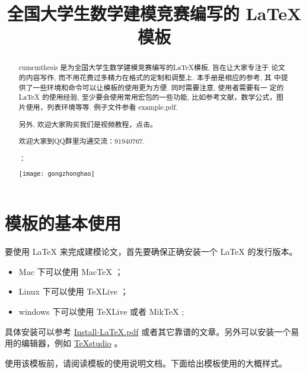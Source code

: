 \documentclass{cumcmthesis}
\title{全国大学生数学建模竞赛编写的 \LaTeX{} 模板}
\begin{document}
 \maketitle
 \begin{abstract}
cumcmthesis 是为全国大学生数学建模竞赛编写的\LaTeX{}模板, 旨在让大家专注于 论文的内容写作, 而不用花费过多精力在格式的定制和调整上. 本手册是相应的参考, 其 中提供了一些环境和命令可以让模板的使用更为方便. 同时需要注意, 使用者需要有一 定的 \LaTeX{} 的使用经验, 至少要会使用常用宏包的一些功能, 比如参考文献，数学公式，图片使用，列表环境等等. 例子文件参看 example.pdf.

另外, 欢迎大家购买我们是视频教程，点击\href{https://item.taobao.com/item.htm?spm=a1z10.1-c.w4004-3473795048.4.ThFQCG&id=43823508044}{}。

欢迎大家到QQ群里沟通交流：91940767.

：

\centerline{\texttt{[image: gongzhonghao]}}

\end{abstract}

\tableofcontents

\newpage

\section{模板的基本使用}

要使用 \LaTeX{} 来完成建模论文，首先要确保正确安装一个 \LaTeX{} 的发行版本。

\begin{itemize}
    \item Mac 下可以使用 Mac\TeX{} ；
    \item Linux 下可以使用 \TeX{}Live ；
    \item windows 下可以使用 \TeX{}Live 或者 Mik\TeX{} ;
\end{itemize}

具体安装可以参考 \href{https://github.com/OsbertWang/install_latex/releases/download/v4.6/Install-LaTeX.pdf}{Install-LaTeX.pdf} 或者其它靠谱的文章。另外可以安装一个易用的编辑器，例如 \href{https://github.com/texstudio-org/texstudio/releases/download/2.12.16/texstudio-2.12.16-win-qt5.exe}{\TeX{}studio} 。

使用该模板前，请阅读模板的使用说明文档。下面给出模板使用的大概样式。
\end{document}
